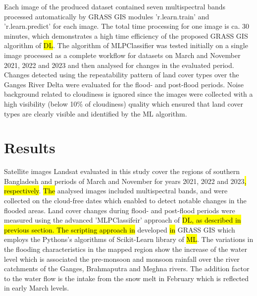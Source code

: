 \documentclass[water,article,submit,pdftex,moreauthors]{Definitions/mdpi}
\begin{document}
Each image of the produced dataset contained seven multispectral bands processed automatically by GRASS GIS modules 'r.learn.train' and 'r.learn.predict' for each image. The total time processing for one image is ca. 30 minutes, which demonstrates a high time efficiency of the proposed GRASS GIS algorithm of \hl{DL}. The algorithm of MLPClassifier was tested initially on a single image processed as a complete workflow for datasets on March and November 2021, 2022 and 2023 and then analysed for changes in the evaluated period. Changes detected using the repeatability pattern of land cover types over the Ganges River Delta were evaluated for the flood- and post-flood periods. Noise background related to cloudiness is ignored since the images were collected with a high visibility (below 10\% of cloudiness) quality which ensured that land cover types are clearly visible and identified by the ML algorithm. 

\section{Results}

Satellite images Landsat evaluated in this study cover the regions of southern Bangladesh and periods of March and November for years 2021, 2022 and 2023\hl{, respectively}. \hl{The }analysed images included multispectral bands, and were collected on the cloud-free dates which enabled to detect notable changes in the flooded areas. Land cover changes during flood- and post-flood periods were measured using the advanced 'MLPClassifeir' approach of \hl{DL, as described in previous section. The scripting approach in }developed \hl{in} GRASS GIS which employs the Pythons's algorithms of Scikit-Learn library of \hl{ML}. The variations in the flooding characteristics in the mapped region show the increase of the water level which is associated the pre-monsoon and monsoon rainfall over the river catchments of the Ganges, Brahmaputra and Meghna rivers. The addition factor to the water flow is the intake from the snow melt in February which is reflected in early March levels. 
\end{document}
